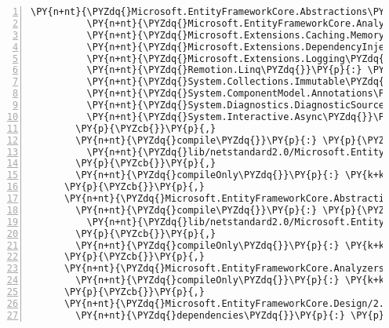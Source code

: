 \begin{Verbatim}[commandchars=\\\{\},numbers=left,firstnumber=1,stepnumber=1,numberblanklines=0]
          \PY{n+nt}{\PYZdq{}Microsoft.EntityFrameworkCore.Abstractions\PYZdq{}}\PY{p}{:} \PY{l+s+s2}{\PYZdq{}2.1.0\PYZhy{}rc1\PYZhy{}final\PYZdq{}}\PY{p}{,}
          \PY{n+nt}{\PYZdq{}Microsoft.EntityFrameworkCore.Analyzers\PYZdq{}}\PY{p}{:} \PY{l+s+s2}{\PYZdq{}2.1.0\PYZhy{}rc1\PYZhy{}final\PYZdq{}}\PY{p}{,}
          \PY{n+nt}{\PYZdq{}Microsoft.Extensions.Caching.Memory\PYZdq{}}\PY{p}{:} \PY{l+s+s2}{\PYZdq{}2.1.0\PYZhy{}rc1\PYZhy{}final\PYZdq{}}\PY{p}{,}
          \PY{n+nt}{\PYZdq{}Microsoft.Extensions.DependencyInjection\PYZdq{}}\PY{p}{:} \PY{l+s+s2}{\PYZdq{}2.1.0\PYZhy{}rc1\PYZhy{}final\PYZdq{}}\PY{p}{,}
          \PY{n+nt}{\PYZdq{}Microsoft.Extensions.Logging\PYZdq{}}\PY{p}{:} \PY{l+s+s2}{\PYZdq{}2.1.0\PYZhy{}rc1\PYZhy{}final\PYZdq{}}\PY{p}{,}
          \PY{n+nt}{\PYZdq{}Remotion.Linq\PYZdq{}}\PY{p}{:} \PY{l+s+s2}{\PYZdq{}2.2.0\PYZdq{}}\PY{p}{,}
          \PY{n+nt}{\PYZdq{}System.Collections.Immutable\PYZdq{}}\PY{p}{:} \PY{l+s+s2}{\PYZdq{}1.5.0\PYZhy{}rc1\PYZdq{}}\PY{p}{,}
          \PY{n+nt}{\PYZdq{}System.ComponentModel.Annotations\PYZdq{}}\PY{p}{:} \PY{l+s+s2}{\PYZdq{}4.5.0\PYZhy{}rc1\PYZdq{}}\PY{p}{,}
          \PY{n+nt}{\PYZdq{}System.Diagnostics.DiagnosticSource\PYZdq{}}\PY{p}{:} \PY{l+s+s2}{\PYZdq{}4.5.0\PYZhy{}rc1\PYZdq{}}\PY{p}{,}
          \PY{n+nt}{\PYZdq{}System.Interactive.Async\PYZdq{}}\PY{p}{:} \PY{l+s+s2}{\PYZdq{}3.1.1\PYZdq{}}
        \PY{p}{\PYZcb{}}\PY{p}{,}
        \PY{n+nt}{\PYZdq{}compile\PYZdq{}}\PY{p}{:} \PY{p}{\PYZob{}}
          \PY{n+nt}{\PYZdq{}lib/netstandard2.0/Microsoft.EntityFrameworkCore.dll\PYZdq{}}\PY{p}{:} \PY{p}{\PYZob{}}\PY{p}{\PYZcb{}}
        \PY{p}{\PYZcb{}}\PY{p}{,}
        \PY{n+nt}{\PYZdq{}compileOnly\PYZdq{}}\PY{p}{:} \PY{k+kc}{true}
      \PY{p}{\PYZcb{}}\PY{p}{,}
      \PY{n+nt}{\PYZdq{}Microsoft.EntityFrameworkCore.Abstractions/2.1.0\PYZhy{}rc1\PYZhy{}final\PYZdq{}}\PY{p}{:} \PY{p}{\PYZob{}}
        \PY{n+nt}{\PYZdq{}compile\PYZdq{}}\PY{p}{:} \PY{p}{\PYZob{}}
          \PY{n+nt}{\PYZdq{}lib/netstandard2.0/Microsoft.EntityFrameworkCore.Abstractions.dll\PYZdq{}}\PY{p}{:} \PY{p}{\PYZob{}}\PY{p}{\PYZcb{}}
        \PY{p}{\PYZcb{}}\PY{p}{,}
        \PY{n+nt}{\PYZdq{}compileOnly\PYZdq{}}\PY{p}{:} \PY{k+kc}{true}
      \PY{p}{\PYZcb{}}\PY{p}{,}
      \PY{n+nt}{\PYZdq{}Microsoft.EntityFrameworkCore.Analyzers/2.1.0\PYZhy{}rc1\PYZhy{}final\PYZdq{}}\PY{p}{:} \PY{p}{\PYZob{}}
        \PY{n+nt}{\PYZdq{}compileOnly\PYZdq{}}\PY{p}{:} \PY{k+kc}{true}
      \PY{p}{\PYZcb{}}\PY{p}{,}
      \PY{n+nt}{\PYZdq{}Microsoft.EntityFrameworkCore.Design/2.1.0\PYZhy{}rc1\PYZhy{}final\PYZdq{}}\PY{p}{:} \PY{p}{\PYZob{}}
        \PY{n+nt}{\PYZdq{}dependencies\PYZdq{}}\PY{p}{:} \PY{p}{\PYZob{}}

\end{Verbatim}
